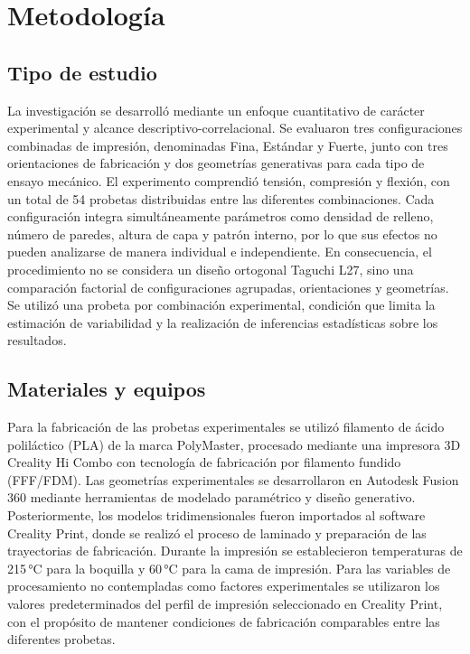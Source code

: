 \documentclass[10pt,twocolumn]{article}
\begin{document}
\section{Metodología}
\subsection{Tipo de estudio}
La investigación se desarrolló mediante un enfoque cuantitativo de carácter experimental y alcance descriptivo-correlacional. Se evaluaron tres configuraciones combinadas de impresión, denominadas Fina, Estándar y Fuerte, junto con tres orientaciones de fabricación y dos geometrías generativas para cada tipo de ensayo mecánico. El experimento comprendió tensión, compresión y flexión, con un total de 54 probetas distribuidas entre las diferentes combinaciones. Cada configuración integra simultáneamente parámetros como densidad de relleno, número de paredes, altura de capa y patrón interno, por lo que sus efectos no pueden analizarse de manera individual e independiente. En consecuencia, el procedimiento no se considera un diseño ortogonal Taguchi L27, sino una comparación factorial de configuraciones agrupadas, orientaciones y geometrías. Se utilizó una probeta por combinación experimental, condición que limita la estimación de variabilidad y la realización de inferencias estadísticas sobre los resultados.
\subsection{Materiales y equipos}
Para la fabricación de las probetas experimentales se utilizó filamento de ácido poliláctico (PLA) de la marca PolyMaster, procesado mediante una impresora 3D Creality Hi Combo con tecnología de fabricación por filamento fundido (FFF/FDM). Las geometrías experimentales se desarrollaron en Autodesk Fusion 360 mediante herramientas de modelado paramétrico y diseño generativo. Posteriormente, los modelos tridimensionales fueron importados al software Creality Print, donde se realizó el proceso de laminado y preparación de las trayectorias de fabricación. Durante la impresión se establecieron temperaturas de 215\,°C para la boquilla y 60\,°C para la cama de impresión. Para las variables de procesamiento no contempladas como factores experimentales se utilizaron los valores predeterminados del perfil de impresión seleccionado en Creality Print, con el propósito de mantener condiciones de fabricación comparables entre las diferentes probetas.
\end{document}
